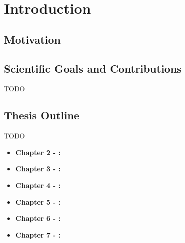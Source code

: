 \chapter{Introduction} %
\label{chap:Chapter1}  %

\section{Motivation}
\label{sec:Chapter1-1} 

\section{Scientific Goals and Contributions}
\label{sec:Chapter1-2} 

TODO

\section{Thesis Outline}
\label{sec:Chapter1-3} 

    TODO
    \begin{itemize}
        \item \textbf{Chapter 2 - {\hypersetup{hidelinks}}:}
        \item \textbf{Chapter 3 - {\hypersetup{hidelinks}}:}
        \item \textbf{Chapter 4 - {\hypersetup{hidelinks}}:}                %
        \item \textbf{Chapter 5 - {\hypersetup{hidelinks}}:}       %
        \item \textbf{Chapter 6 - {\hypersetup{hidelinks}}:}
        \item \textbf{Chapter 7 - {\hypersetup{hidelinks}}:}
    \end{itemize}
